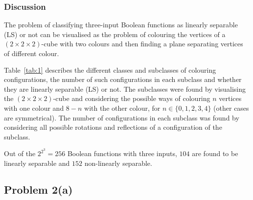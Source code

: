 \documentclass[12pt,titlepage]{article}
\begin{document}
\subsubsection*{Discussion}
The problem of classifying three-input Boolean functions as linearly separable (LS) or not can be visualised as the problem of colouring the vertices of a $(2 \times 2 \times 2)$-cube with two colours and then finding a plane separating vertices of different colour.

Table~\ref{tab:1} describes the different classes and subclasses of colouring configurations, the number of such configurations in each subclass and whether they are linearly separable (LS) or not. The subclasses were found by visualising the $(2 \times 2 \times 2)$-cube and considering the possible ways of colouring $n$ vertices with one colour and $8-n$ with the other colour, for $n \in \lbrace0,1,2,3,4\rbrace$ (other cases are symmetrical). The number of configurations in each subclass was found by considering all possible rotations and reflections of a configuration of the subclass.

Out of the $2^{2^3} = 256$ Boolean functions with three inputs, $104$ are found to be linearly separable and $152$ non-linearly separable.
\clearpage

\subsection*{Problem 2(a)}
\end{document}
